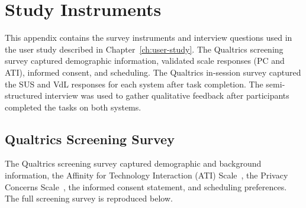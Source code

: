 \chapter{Study Instruments}
\label{ap:instruments}

This appendix contains the survey instruments and interview questions used in the user study described in Chapter~\ref{ch:user-study}. The Qualtrics screening survey captured demographic information, validated scale responses (PC and ATI), informed consent, and scheduling. The Qualtrics in-session survey captured the SUS and VdL responses for each system after task completion. The semi-structured interview was used to gather qualitative feedback after participants completed the tasks on both systems.

\section{Qualtrics Screening Survey}
\label{sec:screening-survey}

The Qualtrics screening survey captured demographic and background information, the Affinity for Technology Interaction (ATI) Scale~\cite{franke_personal_2019}, the Privacy Concerns Scale~\cite{langer_information_2018}, the informed consent statement, and scheduling preferences. The full screening survey is reproduced below.

